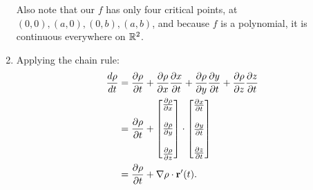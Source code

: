 \documentclass{article}
\begin{document}
\begin{enumerate}
Also note that our $f$ has only four critical points, at $(0,0), (a,0), (0,b), (a,b)$, and because $f$ is a polynomial, it is continuous everywhere on $\mathbb{R}^2$. 
\item Applying the chain rule:
\begin{align*}
  \frac{d\rho}{dt} &= \frac{\partial \rho}{\partial t} + \frac{\partial \rho}{\partial x} \frac{\partial x}{\partial t} + \frac{\partial \rho}{\partial y} \frac{\partial y}{\partial t} +\frac{\partial \rho}{\partial z} \frac{\partial z}{\partial t} \\
  &= \frac{\partial \rho}{\partial t} + \begin{bmatrix} \frac{\partial \rho}{\partial x}  \\ \\  \frac{\partial \rho}{\partial y} \\ \\ \frac{\partial \rho}{\partial z}\end{bmatrix} \cdot \begin{bmatrix} \frac{\partial x}{\partial t} \\\\ \frac{\partial y}{\partial t} \\\\ \frac{\partial z}{\partial t} \end{bmatrix} \\
    &= \frac{\partial \rho}{\partial t} + \nabla \rho \cdot \mathbf{r}'(t). 
\end{align*}

\end{enumerate}
\end{document}
